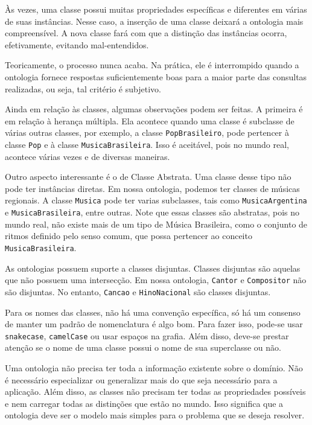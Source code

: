 Às vezes, uma classe possui muitas propriedades específicas e diferentes em várias de suas instâncias. Nesse caso, a inserção de uma classe deixará a ontologia mais compreensível. A nova classe fará com que a distinção das instâncias ocorra, efetivamente, evitando mal-entendidos.

Teoricamente, o processo nunca acaba. Na prática, ele é interrompido quando a ontologia fornece respostas suficientemente boas para a maior parte das consultas realizadas, ou seja, tal critério é subjetivo.

Ainda em relação às classes, algumas observações podem ser feitas. A primeira é em relação à herança múltipla. Ela acontece quando uma classe é subclasse de várias outras classes, por exemplo, a classe \texttt{PopBrasileiro}, pode pertencer à classe \texttt{Pop} e à classe \texttt{MusicaBrasileira}. Isso é aceitável, pois no mundo real, acontece várias vezes e de diversas maneiras.

Outro aspecto interessante é o de Classe Abstrata. Uma classe desse tipo não pode ter instâncias diretas. Em nossa ontologia, podemos ter classes de músicas regionais. A classe \texttt{Musica} pode ter varias subclasses, tais como \texttt{MusicaArgentina} e \texttt{MusicaBrasileira}, entre outras. Note que essas classes são abstratas, pois no mundo real, não existe mais de um tipo de Música Brasileira, como o conjunto de ritmos definido pelo senso comum, que possa pertencer ao conceito \texttt{MusicaBrasileira}.

As ontologias possuem suporte a classes disjuntas. Classes disjuntas são aquelas que não possuem uma intersecção. Em nossa ontologia, \texttt{Cantor} e \texttt{Compositor} não são disjuntas. No entanto, \texttt{Cancao} e \texttt{HinoNacional} são classes disjuntas.

Para os nomes das classes, não há uma convenção específica, só há um consenso de manter um padrão de nomenclatura é algo bom. Para fazer isso, pode-se usar \texttt{snake\textunderscore case}, \texttt{camelCase} ou usar espaços na grafia. Além disso, deve-se prestar atenção se o nome de uma classe possui o nome de sua superclasse ou não.

Uma ontologia não precisa ter toda a informação existente sobre o domínio. Não é necessário especializar ou generalizar mais do que seja necessário para a aplicação. Além disso, as classes não precisam ter todas as propriedades possíveis e nem carregar todas as distinções que estão no mundo. Isso significa que a ontologia deve ser o modelo mais simples para o problema que se deseja resolver.

